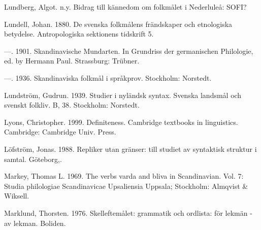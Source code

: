 \begin{styleBodytextC}
Lundberg, Algot. n.y. Bidrag till kännedom om folkmålet i Nederluleå: SOFI?

\end{styleBodytextC}

\begin{styleBodytextC}
Lundell, Johan. 1880. De svenska folkmålens frändskaper och etnologiska betydelse. Antropologiska sektionens tidskrift 5.

\end{styleBodytextC}

\begin{styleBodytextC}
—. 1901. Skandinavische Mundarten. In Grundriss der germanischen Philologie, ed. by Hermann Paul. Strassburg: Trübner.

\end{styleBodytextC}

\begin{styleBodytextC}
—.  1936. Skandinaviska folkmål i språkprov. Stockholm: Norstedt.

\end{styleBodytextC}

\begin{styleBodytextC}
Lundström, Gudrun. 1939. Studier i nyländsk syntax. Svenska landsmål och svenskt folkliv. B, 38. Stockholm: Norstedt.

\end{styleBodytextC}

\begin{styleBodytextC}
Lyons, Christopher. 1999. Definiteness. Cambridge textbooks in linguistics. Cambridge: Cambridge Univ. Press.

\end{styleBodytextC}

\begin{styleBodytextC}
Löfström, Jonas. 1988. Repliker utan gränser: till studiet av syntaktisk struktur i samtal. Göteborg,.

\end{styleBodytextC}

\begin{styleBodytextC}
Markey, Thomas L. 1969. The verbs varda and bliva in Scandinavian. Vol. 7: Studia philologiae Scandinavicae Upsaliensia Uppsala; Stockholm: Almqvist \& Wiksell.

\end{styleBodytextC}

\begin{styleBodytextC}
Marklund, Thorsten. 1976. Skelleftemålet: grammatik och ordlista: för lekmän - av lekman. Boliden.

\end{styleBodytextC}

